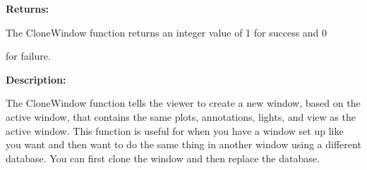 \documentclass[letterpaper,10pt,english]{sphinxmanual}
\begin{document}
\begin{DUlineblock}{0em}
\item[] 
\item[] \textbf{Returns:}
\item[] The CloneWindow function returns an integer value of 1 for success and 0
\item[] for failure.
\item[] 
\item[] \textbf{Description:}
\item[] The CloneWindow function tells the viewer to create a new window, based on
the active window, that contains the same plots, annotations, lights, and
view as the active window. This function is useful for when you have a
window set up like you want and then want to do the same thing in another
window using a different database. You can first clone the window and then
replace the database.
\end{DUlineblock}

\begin{DUlineblock}{0em}
\item[] 
\end{DUlineblock}
\end{document}

